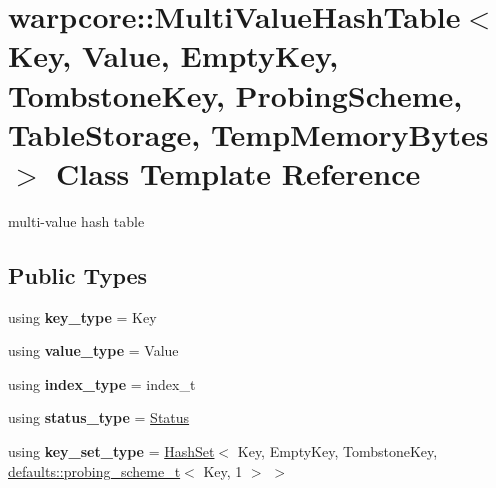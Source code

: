\hypertarget{classwarpcore_1_1MultiValueHashTable}{}\section{warpcore\+:\+:Multi\+Value\+Hash\+Table$<$ Key, Value, Empty\+Key, Tombstone\+Key, Probing\+Scheme, Table\+Storage, Temp\+Memory\+Bytes $>$ Class Template Reference}
\label{classwarpcore_1_1MultiValueHashTable}


multi-\/value hash table  


\subsection*{Public Types}
\begin{DoxyCompactItemize}
\item 
\mbox{\label{classwarpcore_1_1MultiValueHashTable_aa7aebc954f2d00ac412e64696ac5b48c}} 
using {\bfseries key\+\_\+type} = Key
\item 
\mbox{\label{classwarpcore_1_1MultiValueHashTable_a06eeeced208185ad11e626661f2b89d8}} 
using {\bfseries value\+\_\+type} = Value
\item 
\mbox{\label{classwarpcore_1_1MultiValueHashTable_aa16ca6512e6de1bc13bc43ef4181ec57}} 
using {\bfseries index\+\_\+type} = index\+\_\+t
\item 
\mbox{\label{classwarpcore_1_1MultiValueHashTable_ace3917bfbc275542adfcab08112a6e92}} 
using {\bfseries status\+\_\+type} = \hyperlink{classwarpcore_1_1Status}{Status}
\item 
\mbox{\label{classwarpcore_1_1MultiValueHashTable_a588acfac8741ca75ddaa4771a7723416}} 
using {\bfseries key\+\_\+set\+\_\+type} = \hyperlink{classwarpcore_1_1HashSet}{Hash\+Set}$<$ Key, Empty\+Key, Tombstone\+Key, \hyperlink{classwarpcore_1_1probing__schemes_1_1DoubleHashing}{defaults\+::probing\+\_\+scheme\+\_\+t}$<$ Key, 1 $>$ $>$
\end{DoxyCompactItemize}
